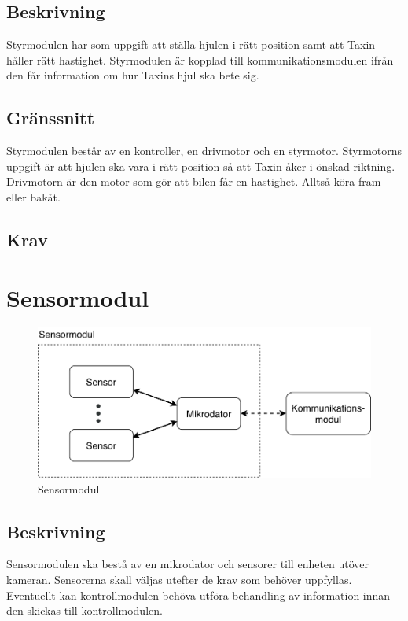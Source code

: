 \documentclass[kravspec/krav.tex]{subfiles}
\begin{document}
\subsection{Beskrivning}
Styrmodulen har som uppgift att ställa hjulen i rätt position samt att Taxin
håller rätt hastighet. Styrmodulen är kopplad till kommunikationsmodulen ifrån
den får information om hur Taxins hjul ska bete sig.

\subsection{Gränssnitt}
Styrmodulen består av en kontroller, en drivmotor och en styrmotor. Styrmotorns
uppgift är att hjulen ska vara i rätt position så att Taxin åker i önskad
riktning. Drivmotorn är den motor som gör att bilen får en hastighet. Alltså
köra fram eller bakåt.

\subsection{Krav}
\begin{reqlist}
    \req{}
\end{reqlist}

\clearpage
\section{Sensormodul}
\begin{figure}[h]
    \centering
    \includegraphics[width=0.6\linewidth]{kravspec/figures/sensormodul.pdf}
    \caption{Sensormodul}
    \label{fig:sensormodul}
\end{figure}

\subsection{Beskrivning}
Sensormodulen ska bestå av en mikrodator och sensorer till enheten utöver
kameran. Sensorerna skall väljas utefter de krav som behöver uppfyllas.
Eventuellt kan kontrollmodulen behöva utföra behandling av information innan
den skickas till kontrollmodulen.
\end{document}

